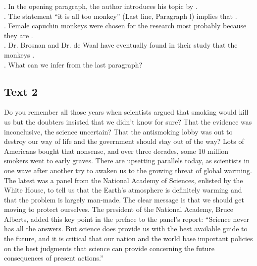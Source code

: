 \begin{questions}  .	In the opening paragraph, the author introduces his topic by \ltk{}.\\
 .	The statement “it is all too monkey” (Last line, Paragraph l) implies that \ltk{}.\\
 .	Female capuchin monkeys were chosen for the research most probably because they are \ltk{}.\\
 .	Dr. Brosnan and Dr. de Waal have eventually found in their study that the monkeys \ltk{}.\\
 .	What can we infer from the last paragraph?
\end{questions}    \subsection{Text 2}
Do you remember all those years when scientists argued that smoking would kill us but the doubters insisted that we didn’t know for sure? That the evidence was inconclusive, the science uncertain? That the antismoking lobby was out to destroy our way of life and the government should stay out of the way? Lots of Americans bought that nonsense, and over three decades, some 10 million smokers went to early graves.
There are upsetting parallels today, as scientists in one wave after another try to awaken us to the growing threat of global warming. The latest was a panel from the National Academy of Sciences, enlisted by the White House, to tell us that the Earth’s atmosphere is definitely warming and that the problem is largely man-made. The clear message is that we should get moving to protect ourselves. The president of the National Academy, Bruce Alberts, added this key point in the preface to the panel’s report: “Science never has all the answers. But science does provide us with the best available guide to the future, and it is critical that our nation and the world base important policies on the best judgments that science can provide concerning the future consequences of present actions.”
